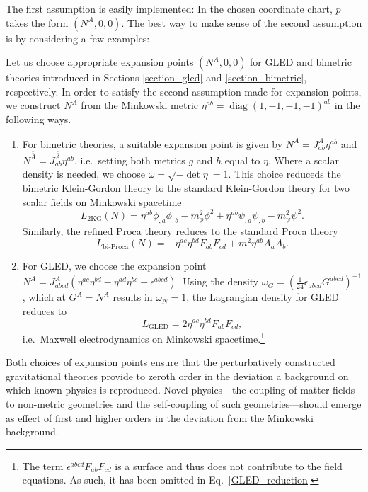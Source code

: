The first assumption is easily implemented: In the chosen coordinate chart, $p$ takes the form $(N^A,0,0)$. The best way to make sense of the second assumption is by considering a few examples:
\begin{example}
  Let us choose appropriate expansion points $(N^A,0,0)$ for GLED and bimetric theories introduced in Sections \ref{section_gled} and \ref{section_bimetric}, respectively. In order to satisfy the second assumption made for expansion points, we construct $N^A$ from the Minkowski metric $\eta^{ab} = \operatorname{diag}(1,-1,-1,-1)^{ab}$ in the following ways.
  \begin{enumerate}
    \item{For bimetric theories, a suitable expansion point is given by $N^{\bar A} = J_{ab}^{\bar A} \eta^{ab}$ and $N^{\bar{\bar A}} = J_{ab}^{\bar{\bar A}} \eta^{ab}$, i.e.~setting both metrics $g$ and $h$ equal to $\eta$. Where a scalar density is needed, we choose $\omega = \sqrt{-\operatorname{det}\eta} = 1$. This choice reduceds the bimetric Klein-Gordon theory to the standard Klein-Gordon theory for two scalar fields on Minkowski spacetime
      \begin{equation}
        L_\text{2KG}(N) = \eta^{ab} \phi_{,a} \phi_{,b} - m_\phi^2\phi^2 + \eta^{ab} \psi_{,a} \psi_{,b} - m_\psi^2\psi^2.
      \end{equation}
    Similarly, the refined Proca theory reduces to the standard Proca theory
      \begin{equation}
        L_\text{bi-Proca}(N) = -\eta^{ac}\eta^{bd}F_{ab}F_{cd} + m^2\eta^{ab}A_aA_b.
      \end{equation}}
    \item{For GLED, we choose the expansion point $N^A = J_{abcd}^A (\eta^{ac} \eta^{bd} - \eta^{ad} \eta^{bc} + \epsilon^{abcd})$. Using the density $\omega_G = (\frac{1}{24}\epsilon_{abcd}G^{abcd})^{-1}$, which at $G^A=N^A$ results in $\omega_N = 1$, the Lagrangian density for GLED reduces to
        \begin{equation}\label{GLED_reduction}
        L_\text{GLED} = 2 \eta^{ac}\eta^{bd} F_{ab}F_{cd},
      \end{equation}
    i.e.~Maxwell electrodynamics on Minkowski spacetime.\footnote{The term $\epsilon^{abcd}F_{ab}F_{cd}$ is a surface and thus does not contribute to the field equations. As such, it has been omitted in Eq.~\ref{GLED_reduction}}}
  \end{enumerate}
\end{example}
Both choices of expansion points ensure that the perturbatively constructed gravitational theories provide to zeroth order in the deviation a background on which known physics is reproduced. Novel physics---the coupling of matter fields to non-metric geometries and the self-coupling of such geometries---should emerge as effect of first and higher orders in the deviation from the Minkowski background.

